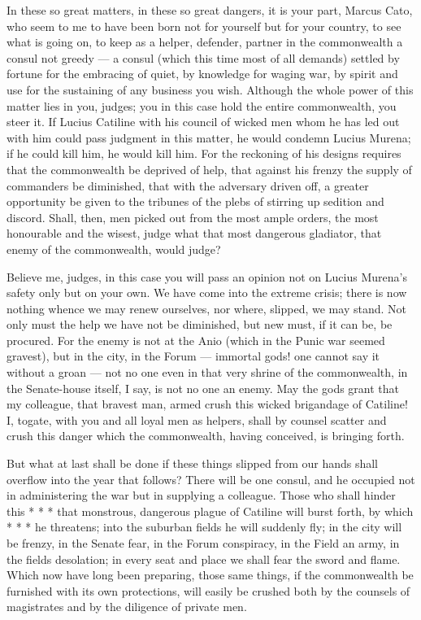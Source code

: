  In these so great matters, in these so great dangers, it is your part, Marcus Cato, who seem to me to have been born not for yourself but for your country, to see what is going on, to keep as a helper, defender, partner in the commonwealth a consul not greedy --- a consul (which this time most of all demands) settled by fortune for the embracing of quiet, by knowledge for waging war, by spirit and use for the sustaining of any business you wish. Although the whole power of this matter lies in you, judges; you in this case hold the entire commonwealth, you steer it. If Lucius Catiline with his council of wicked men whom he has led out with him could pass judgment in this matter, he would condemn Lucius Murena; if he could kill him, he would kill him. For the reckoning of his designs requires that the commonwealth be deprived of help, that against his frenzy the supply of commanders be diminished, that with the adversary driven off, a greater opportunity be given to the tribunes of the plebs of stirring up sedition and discord. Shall, then, men picked out from the most ample orders, the most honourable and the wisest, judge what that most dangerous gladiator, that enemy of the commonwealth, would judge?

 Believe me, judges, in this case you will pass an opinion not on Lucius Murena's safety only but on your own. We have come into the extreme crisis; there is now nothing whence we may renew ourselves, nor where, slipped, we may stand. Not only must the help we have not be diminished, but new must, if it can be, be procured. For the enemy is not at the Anio (which in the Punic war seemed gravest), but in the city, in the Forum --- immortal gods! one cannot say it without a groan --- not no one even in that very shrine of the commonwealth, in the Senate-house itself, I say, is not no one an enemy. May the gods grant that my colleague, that bravest man, armed crush this wicked brigandage of Catiline! I, togate, with you and all loyal men as helpers, shall by counsel scatter and crush this danger which the commonwealth, having conceived, is bringing forth.

 But what at last shall be done if these things slipped from our hands shall overflow into the year that follows? There will be one consul, and he occupied not in administering the war but in supplying a colleague. Those who shall hinder this * * * that monstrous, dangerous plague of Catiline will burst forth, by which * * * he threatens; into the suburban fields he will suddenly fly; in the city will be frenzy, in the Senate fear, in the Forum conspiracy, in the Field an army, in the fields desolation; in every seat and place we shall fear the sword and flame. Which now have long been preparing, those same things, if the commonwealth be furnished with its own protections, will easily be crushed both by the counsels of magistrates and by the diligence of private men.

